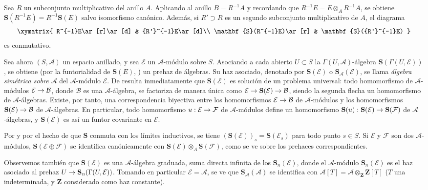 \documentclass[oneside,10pt]{amsart}
\makeatletter
\newcommand{\ega@arrow}[2]{\mathchoice{#1}{#2}{#2}{#2}}
\renewcommand{\to}{\ega@arrow{\longrightarrow}{\rightarrow}}
\newcommand{\oldpage}[2][]{\marginnote{\normalfont\footnotesize\textbf{#1}~|~#2}\ignorespaces}
\let\EGAOriginalLabel\label
\renewcommand{\label}[1]{\phantomsection\EGAOriginalLabel{#1}}
\makeatother
\begin{document}
\begin{env}[1.7.3]
\label{II.1.7.3-fr}
Sea $R$ un subconjunto multiplicativo del anillo $A$.
Aplicando  al anillo $B=R^{-1}A$ y recordando que $R^{-1}E=E\otimes_A R^{-1}A$, se obtiene $\mathbf{S}(R^{-1}E)=R^{-1}\mathbf{S}(E)$ salvo isomorfismo canónico.
Además, si $R'\supset R$ es un segundo subconjunto multiplicativo de $A$, el diagrama
\[
  \xymatrix{
    R^{-1}E\ar[r]\ar[d] & {R'}^{-1}E\ar[d]\\
    \mathbf{S}(R^{-1}E)\ar[r] & \mathbf{S}({R'}^{-1}E)
  }
\]
es conmutativo.
\end{env}

\begin{env}[1.7.4]
\label{II.1.7.4-fr}
Sea ahora $(S,\mathcal{A})$ un espacio anillado, y sea $\mathcal{E}$ un $\mathcal{A}$-módulo sobre $S$.
Asociando a cada abierto $U\subset S$ la $\Gamma(U,\mathcal{A})$-álgebra $\mathbf{S}(\Gamma(U,\mathcal{E}))$, se obtiene (por la funtorialidad de $\mathbf{S}(E)$, ) un prehaz de álgebras.
Su haz asociado, denotado por $\mathbf{S}(\mathcal{E})$ o $\mathbf{S}_{\mathcal{A}}(\mathcal{E})$, se llama \emph{álgebra simétrica sobre $\mathcal{A}$} del $\mathcal{A}$-módulo $\mathcal{E}$.
De  resulta inmediatamente que $\mathbf{S}(\mathcal{E})$ es solución de un problema universal: todo homomorfismo de $\mathcal{A}$-módulos $\mathcal{E}\to\mathcal{B}$, donde $\mathcal{B}$ es una $\mathcal{A}$-álgebra, se factoriza de manera única como
$\mathcal{E}\to\mathbf{S}(\mathcal{E})\to\mathcal{B}$,
siendo la segunda flecha un homomorfismo de $\mathcal{A}$-álgebras.
Existe, por tanto, una correspondencia biyectiva entre los homomorfismos $\mathcal{E}\to\mathcal{B}$ de $\mathcal{A}$-módulos y los homomorfismos $\mathbf{S}(\mathcal{E})\to\mathcal{B}$ de $\mathcal{A}$-álgebras.
En particular, todo homomorfismo $u:\mathcal{E}\to\mathcal{F}$ de $\mathcal{A}$-módulos define un homomorfismo $\mathbf{S}(u):\mathbf{S}(\mathcal{E})\to\mathbf{S}(\mathcal{F})$ de $\mathcal{A}$-álgebras, y $\mathbf{S}(\mathcal{E})$ es así un funtor covariante en $\mathcal{E}$.

\oldpage[II]{16}
Por  y por el hecho de que $\mathbf{S}$ conmuta con los límites inductivos, se tiene $(\mathbf{S}(\mathcal{E}))_s=\mathbf{S}(\mathcal{E}_s)$ para todo punto $s\in S$.
Si $\mathcal{E}$ y $\mathcal{F}$ son dos $\mathcal{A}$-módulos, $\mathbf{S}(\mathcal{E}\oplus\mathcal{F})$ se identifica canónicamente con $\mathbf{S}(\mathcal{E})\otimes_A\mathbf{S}(\mathcal{F})$, como se ve sobre los prehaces correspondientes.

Observemos también que $\mathbf{S}(\mathcal{E})$ es una $\mathcal{A}$-álgebra graduada, suma directa infinita de los $\mathbf{S}_n(\mathcal{E})$, donde el $\mathcal{A}$-módulo $\mathbf{S}_n(\mathcal{E})$ es el haz asociado al prehaz $U\to\mathbf{S}_n(\Gamma(U,\mathcal{E}))$.
Tomando en particular $\mathcal{E}=\mathcal{A}$, se ve que $\mathbf{S}_{\mathcal{A}}(\mathcal{A})$ se identifica con $\mathcal{A}[T]=\mathcal{A}\otimes_{\mathbf{Z}}\mathbf{Z}[T]$ ($T$ una indeterminada, y $\mathbf{Z}$ considerado como haz constante).
\end{env}
\end{document}
